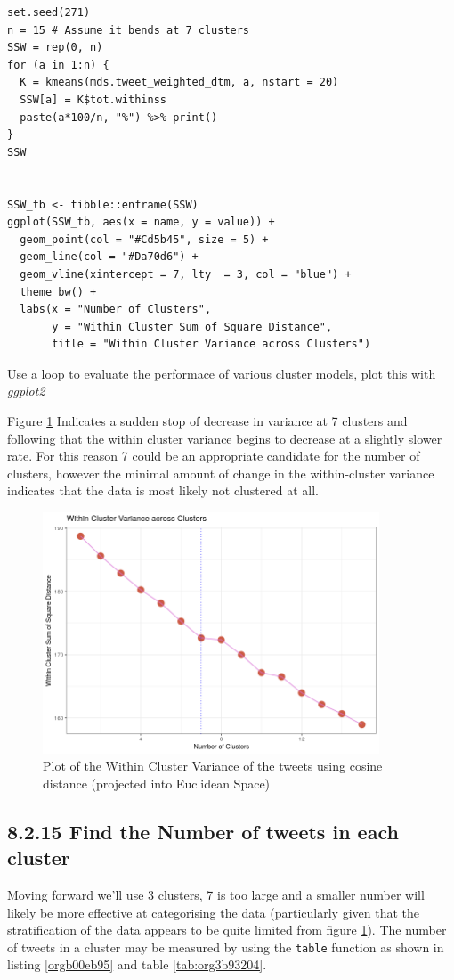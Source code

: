 \documentclass[11pt]{article}
\begin{document}
\begin{listing}[htbp]
\begin{verbatim}
set.seed(271)
n = 15 # Assume it bends at 7 clusters
SSW = rep(0, n)
for (a in 1:n) {
  K = kmeans(mds.tweet_weighted_dtm, a, nstart = 20)
  SSW[a] = K$tot.withinss
  paste(a*100/n, "%") %>% print()
}
SSW


SSW_tb <- tibble::enframe(SSW)
ggplot(SSW_tb, aes(x = name, y = value)) +
  geom_point(col = "#Cd5b45", size = 5) +
  geom_line(col = "#Da70d6") +
  geom_vline(xintercept = 7, lty  = 3, col = "blue") +
  theme_bw() +
  labs(x = "Number of Clusters",
       y = "Within Cluster Sum of Square Distance",
       title = "Within Cluster Variance across Clusters")
\end{verbatim}
\caption{\label{org50a2d95}Use a loop to evaluate the performace of various cluster models, plot this with \emph{ggplot2}}
\end{listing}

Figure \ref{fig:orgcc019b2} Indicates a sudden stop of decrease in variance at 7 clusters and following that the within cluster variance begins to decrease at a slightly slower rate. For this reason 7 could be an appropriate candidate for the number of clusters, however the minimal amount of change in the within-cluster variance indicates that the data is most likely not clustered at all.


\begin{figure}[htbp]
\centering
\includegraphics[width=10cm]{./Figures/Q14WithinClusterVariance.png}
\caption{\label{fig:orgcc019b2}Plot of the Within Cluster Variance of the tweets using cosine distance (projected into Euclidean Space)}
\end{figure}

\subsection{8.2.15 Find the Number of tweets in each cluster}
\label{sec:org214ffc9}
Moving forward we'll use 3 clusters, 7 is too large and a smaller number will likely be more effective at categorising the data (particularly given that the stratification of the data appears to be quite limited from figure \ref{fig:orgcc019b2}). The number of tweets in a cluster may be measured by using the \texttt{table} function as shown in listing \ref{orgb00eb95} and table \ref{tab:org3b93204}.
\end{document}

